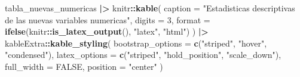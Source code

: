 \documentclass[
]{book}
\newenvironment{Shaded}{\begin{snugshade}}{\end{snugshade}}
\newcommand{\AttributeTok}[1]{\textcolor[rgb]{0.13,0.29,0.53}{#1}}
\newcommand{\ConstantTok}[1]{\textcolor[rgb]{0.56,0.35,0.01}{#1}}
\newcommand{\DecValTok}[1]{\textcolor[rgb]{0.00,0.00,0.81}{#1}}
\newcommand{\FunctionTok}[1]{\textcolor[rgb]{0.13,0.29,0.53}{\textbf{#1}}}
\newcommand{\NormalTok}[1]{#1}
\newcommand{\SpecialCharTok}[1]{\textcolor[rgb]{0.81,0.36,0.00}{\textbf{#1}}}
\newcommand{\StringTok}[1]{\textcolor[rgb]{0.31,0.60,0.02}{#1}}
\begin{document}
\begin{Shaded}
\begin{Highlighting}[]
\NormalTok{tabla\_nuevas\_numericas }\SpecialCharTok{|\textgreater{}}
\NormalTok{  knitr}\SpecialCharTok{::}\FunctionTok{kable}\NormalTok{(}
    \AttributeTok{caption =} \StringTok{"Estadisticas descriptivas de las nuevas variables numericas"}\NormalTok{,}
    \AttributeTok{digits =} \DecValTok{3}\NormalTok{,}
    \AttributeTok{format =} \FunctionTok{ifelse}\NormalTok{(knitr}\SpecialCharTok{::}\FunctionTok{is\_latex\_output}\NormalTok{(), }\StringTok{"latex"}\NormalTok{, }\StringTok{"html"}\NormalTok{)}
\NormalTok{  ) }\SpecialCharTok{|\textgreater{}}
\NormalTok{  kableExtra}\SpecialCharTok{::}\FunctionTok{kable\_styling}\NormalTok{(}
    \AttributeTok{bootstrap\_options =} \FunctionTok{c}\NormalTok{(}\StringTok{"striped"}\NormalTok{, }\StringTok{"hover"}\NormalTok{, }\StringTok{"condensed"}\NormalTok{),}
    \AttributeTok{latex\_options =} \FunctionTok{c}\NormalTok{(}\StringTok{"striped"}\NormalTok{, }\StringTok{"hold\_position"}\NormalTok{, }\StringTok{"scale\_down"}\NormalTok{),}
    \AttributeTok{full\_width =} \ConstantTok{FALSE}\NormalTok{,}
    \AttributeTok{position =} \StringTok{"center"}
\NormalTok{  )}
\end{Highlighting}
\end{Shaded}

\begin{table}[!h]
\centering
\caption{\label{tab:tabla-nuevas-variables-numericas}Estadisticas descriptivas de las nuevas variables numericas}
\centering
{}
\end{table}
\end{document}
